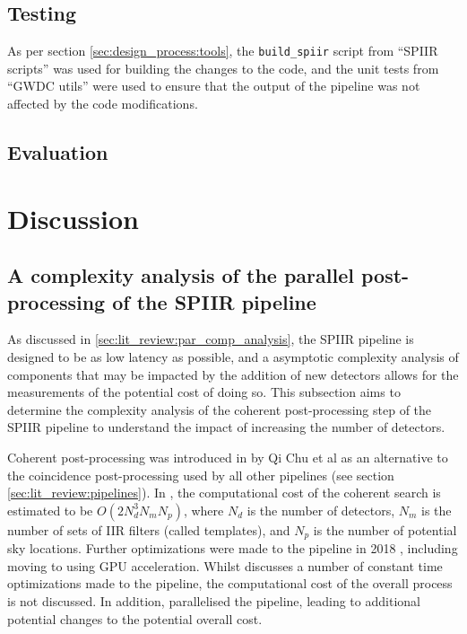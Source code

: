 \documentclass{article}
\begin{document}
\subsection{Testing} \label{sec:final_design:testing}

As per section \ref{sec:design_process:tools}, the \texttt{build\_spiir} script from ``SPIIR scripts'' was used for building the changes to the code, and the unit tests from ``GWDC utils'' were used to ensure that the output of the pipeline was not affected by the code modifications.



\subsection{Evaluation} \label{sec:final_design:evaluation}

\section{Discussion} \label{sec:discuss}

\subsection{A complexity analysis of the parallel post-processing of the SPIIR pipeline} \label{sec:discuss:analysis}

As discussed in \ref{sec:lit_review:par_comp_analysis}, the SPIIR pipeline is designed to be as low latency as possible, and a asymptotic complexity analysis of components that may be impacted by the addition of new detectors allows for the measurements of the potential cost of doing so.
This subsection aims to determine the complexity analysis of the coherent post-processing step of the SPIIR pipeline to understand the impact of increasing the number of detectors.

Coherent post-processing was introduced in \cite{ChuThesis} by Qi Chu et al as an alternative to the coincidence post-processing used by all other pipelines (see section \ref{sec:lit_review:pipelines}).
In \cite{ChuThesis}, the computational cost of the coherent search is estimated to be \(O(2N^3_dN_mN_p)\), where \(N_d\) is the number of detectors, \(N_m\) is the number of sets of IIR filters (called templates), and \(N_p\) is the number of potential sky locations.
Further optimizations were made to the pipeline in 2018 \cite{SPIIRGPU2018}, including moving to using GPU acceleration.
Whilst \cite{SPIIRGPU2018} discusses a number of constant time optimizations made to the pipeline, the computational cost of the overall process is not discussed.
In addition, \cite{SPIIRGPU2018} parallelised the pipeline, leading to additional potential changes to the potential overall cost.
\end{document}
